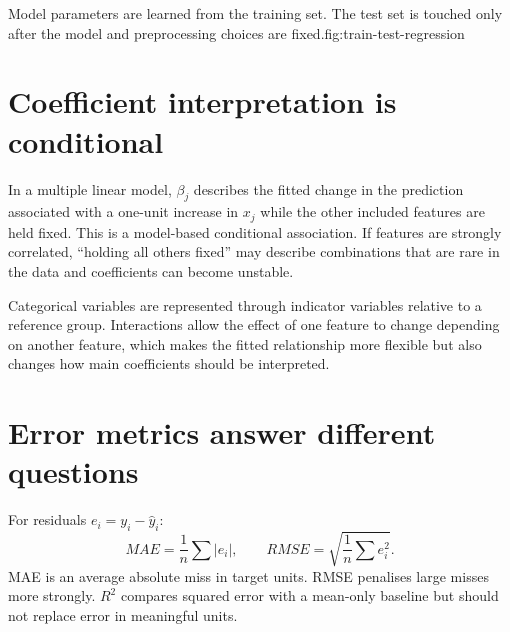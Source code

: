 \begin{utpfig}{Model parameters are learned from the training set. The test set is touched only after the model and preprocessing choices are fixed.}{fig:train-test-regression}
\end{utpfig}


\section{Coefficient interpretation is conditional}
In a multiple linear model, $\beta_j$ describes the fitted change in the prediction associated with a one-unit increase in $x_j$ while the other included features are held fixed. This is a model-based conditional association. If features are strongly correlated, ``holding all others fixed'' may describe combinations that are rare in the data and coefficients can become unstable.

Categorical variables are represented through indicator variables relative to a reference group. Interactions allow the effect of one feature to change depending on another feature, which makes the fitted relationship more flexible but also changes how main coefficients should be interpreted.


\section{Error metrics answer different questions}
For residuals \(e_i=y_i-\hat{y}_i\):
\[
MAE=\frac{1}{n}\sum|e_i|,
\qquad
RMSE=\sqrt{\frac{1}{n}\sum e_i^2}.
\]
MAE is an average absolute miss in target units. RMSE penalises large misses more strongly. \(R^2\) compares squared error with a mean-only baseline but should not replace error in meaningful units.

